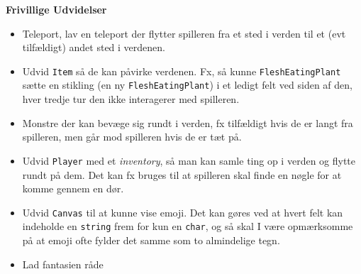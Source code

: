 \textbf{Frivillige Udvidelser}

\begin{itemize}
\item Teleport, lav en teleport der flytter spilleren fra et sted i
  verden til et (evt tilfældigt) andet sted i verdenen.
\item Udvid \lstinline{Item} så de kan påvirke verdenen. Fx, så kunne
  \lstinline{FleshEatingPlant} sætte en stikling (en ny
  \lstinline{FleshEatingPlant}) i et ledigt felt ved
  siden af den, hver tredje tur den ikke interagerer med spilleren.
\item Monstre der kan bevæge sig rundt i verden, fx tilfældigt hvis de
  er langt fra spilleren, men går mod spilleren hvis de er tæt på.
\item Udvid \lstinline{Player} med et \emph{inventory}, så man kan samle ting op i
  verden og flytte rundt på dem. Det kan fx bruges til at spilleren
  skal finde en nøgle for at komme gennem en dør.
\item Udvid \lstinline{Canvas} til at kunne vise emoji. Det kan gøres ved at
  hvert felt kan indeholde en \lstinline{string} frem for kun en \lstinline{char}, og så
  skal I være opmærksomme på at emoji ofte fylder det samme som to
  almindelige tegn.
\item Lad fantasien råde
\end{itemize}

